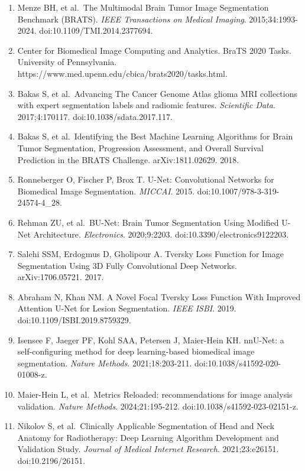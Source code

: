 \documentclass[
  10pt,
  letterpaper,
]{article}
\providecommand{\tightlist}{%
  \setlength{\itemsep}{0pt}\setlength{\parskip}{0pt}}
\begin{document}
\begin{enumerate}
\def\labelenumi{\arabic{enumi}.}
\tightlist
\item
  Menze BH, et al.~The Multimodal Brain Tumor Image Segmentation
  Benchmark (BRATS). \emph{IEEE Transactions on Medical Imaging}.
  2015;34:1993-2024. doi:10.1109/TMI.2014.2377694.
\item
  Center for Biomedical Image Computing and Analytics. BraTS 2020 Tasks.
  University of Pennsylvania.
  https://www.med.upenn.edu/cbica/brats2020/tasks.html.
\item
  Bakas S, et al.~Advancing The Cancer Genome Atlas glioma MRI
  collections with expert segmentation labels and radiomic features.
  \emph{Scientific Data}. 2017;4:170117. doi:10.1038/sdata.2017.117.
\item
  Bakas S, et al.~Identifying the Best Machine Learning Algorithms for
  Brain Tumor Segmentation, Progression Assessment, and Overall Survival
  Prediction in the BRATS Challenge. arXiv:1811.02629. 2018.
\item
  Ronneberger O, Fischer P, Brox T. U-Net: Convolutional Networks for
  Biomedical Image Segmentation. \emph{MICCAI}. 2015.
  doi:10.1007/978-3-319-24574-4\_28.
\item
  Rehman ZU, et al.~BU-Net: Brain Tumor Segmentation Using Modified
  U-Net Architecture. \emph{Electronics}. 2020;9:2203.
  doi:10.3390/electronics9122203.
\item
  Salehi SSM, Erdogmus D, Gholipour A. Tversky Loss Function for Image
  Segmentation Using 3D Fully Convolutional Deep Networks.
  arXiv:1706.05721. 2017.
\item
  Abraham N, Khan NM. A Novel Focal Tversky Loss Function With Improved
  Attention U-Net for Lesion Segmentation. \emph{IEEE ISBI}. 2019.
  doi:10.1109/ISBI.2019.8759329.
\item
  Isensee F, Jaeger PF, Kohl SAA, Petersen J, Maier-Hein KH. nnU-Net: a
  self-configuring method for deep learning-based biomedical image
  segmentation. \emph{Nature Methods}. 2021;18:203-211.
  doi:10.1038/s41592-020-01008-z.
\item
  Maier-Hein L, et al.~Metrics Reloaded: recommendations for image
  analysis validation. \emph{Nature Methods}. 2024;21:195-212.
  doi:10.1038/s41592-023-02151-z.
\item
  Nikolov S, et al.~Clinically Applicable Segmentation of Head and Neck
  Anatomy for Radiotherapy: Deep Learning Algorithm Development and
  Validation Study. \emph{Journal of Medical Internet Research}.
  2021;23:e26151. doi:10.2196/26151.

\end{enumerate}
\end{document}
